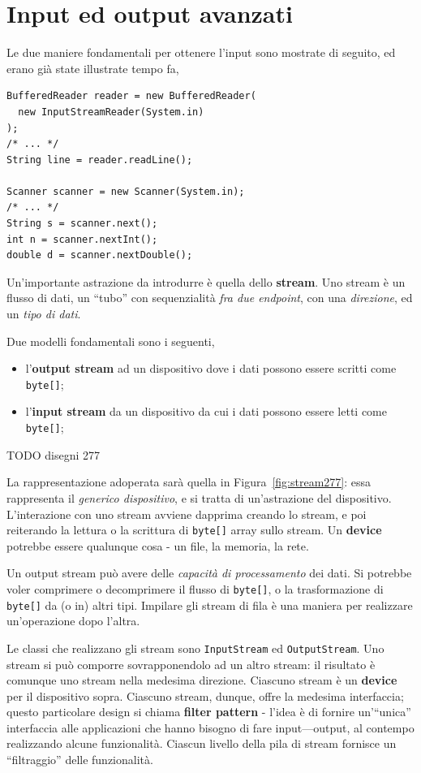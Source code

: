 \documentclass[\fontsizeclass,twocolumn]{\classname}
\theoremstyle{definition}
\theoremstyle{definition}
\begin{document}
\chapter{Input ed output avanzati}

Le due maniere fondamentali per ottenere l'input sono mostrate di seguito, ed
erano già state illustrate tempo fa,

\begin{lstlisting}
BufferedReader reader = new BufferedReader(
  new InputStreamReader(System.in)
);
/* ... */
String line = reader.readLine();

Scanner scanner = new Scanner(System.in);
/* ... */
String s = scanner.next();
int n = scanner.nextInt();
double d = scanner.nextDouble();
\end{lstlisting}

Un'importante astrazione da introdurre è quella dello \textbf{stream}. Uno
stream è un flusso di dati, un ``tubo'' con sequenzialità \emph{fra due
endpoint}, con una \emph{direzione}, ed un \emph{tipo di dati}.

Due modelli fondamentali sono i seguenti,

\begin{itemize}
    \item l'\textbf{output stream} ad un dispositivo dove i dati possono essere
        scritti come \texttt{byte[]};
    \item l'\textbf{input stream} da un dispositivo da cui i dati possono
        essere letti come \texttt{byte[]};
\end{itemize}

TODO disegni 277

La rappresentazione adoperata sarà quella in Figura~\ref{fig:stream277}: essa
rappresenta il \emph{generico dispositivo}, e si tratta di un'astrazione del
dispositivo. L'interazione con uno stream avviene dapprima creando lo stream, e
poi reiterando la lettura o la scrittura di \texttt{byte[]} array sullo stream.
Un \textbf{device} potrebbe essere qualunque cosa \-- un file, la memoria, la
rete. 

Un output stream può avere delle \emph{capacità di processamento} dei dati. Si
potrebbe voler comprimere o decomprimere il flusso di \texttt{byte[]}, o la
trasformazione di \texttt{byte[]} da (o in) altri tipi. Impilare gli stream di
fila è una maniera per realizzare un'operazione dopo l'altra.

Le classi che realizzano gli stream sono \texttt{Input\-Stream} ed
\texttt{Output\-Stream}. Uno stream si può comporre sovrapponendolo ad un altro
stream: il risultato è comunque uno stream nella medesima direzione. Ciascuno
stream è un \textbf{device} per il dispositivo sopra. Ciascuno stream, dunque,
offre la medesima interfaccia; questo particolare design si chiama
\textbf{filter pattern} \-- l'idea è di fornire un'``unica'' interfaccia alle
applicazioni che hanno bisogno di fare input\----output, al contempo
realizzando alcune funzionalità. Ciascun livello della pila di stream fornisce
un ``filtraggio'' delle funzionalità. 
\end{document}
